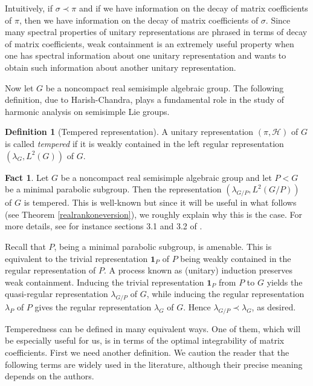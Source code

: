 \documentclass[psamsfonts]{amsart}
\theoremstyle{definition}
\newtheorem{defn}[thm]{Definition}
\newtheorem{fact}[thm]{Fact}
\theoremstyle{remark}
\numberwithin{equation}{section}
\begin{document}
Intuitively, if $\sigma \prec \pi$ and if we have information on the decay of matrix coefficients of $\pi$, then we have information on the decay of matrix coefficients of $\sigma$. Since many spectral properties of unitary representations are phrased in terms of decay of matrix coefficients, weak containment is an extremely useful property when one has spectral information about one unitary representation and wants to obtain such information about another unitary representation.
\par 
Now let $G$ be a noncompact real semisimple algebraic group. The following definition, due to Harish-Chandra, plays a fundamental role in the study of harmonic analysis on semisimple Lie groups.
\begin{defn} [Tempered representation]
A unitary representation $(\pi, \mathcal{H})$ of $G$ is called \emph{tempered} if it is weakly contained in the left regular representation $(\lambda_{G}, L^2(G))$ of $G$.
\end{defn}
\begin{fact}
\label{tempforminparabolic}
Let $G$ be a noncompact real semisimple algebraic group and let $P < G$ be a minimal parabolic subgroup. Then the representation $(\lambda_{G/P}, L^2(G/P))$ of $G$ is tempered. This is well-known but since it will be useful in what follows (see Theorem \ref{realrankoneversion}), we roughly explain why this is the case. For more details, see for instance sections 3.1 and 3.2 of \cite{BL}.
\par 
Recall that $P$, being a minimal parabolic subgroup, is amenable. This is equivalent to the trivial representation $\mathbf{1}_{P}$ of $P$ being weakly contained in the regular representation of $P$. A process known as (unitary) induction preserves weak containment. Inducing the trivial representation $\mathbf{1}_{P}$ from $P$ to $G$ yields the quasi-regular representation $\lambda_{G/P}$ of $G$, while inducing the regular representation $\lambda_{P}$ of $P$ gives the regular representation $\lambda_{G}$ of $G$. Hence $\lambda_{G/P} \prec \lambda_{G}$, as desired.
\end{fact} Temperedness can be defined in many equivalent ways. One of them, which will be especially useful for us, is in terms of the optimal integrability of matrix coefficients. First we need another definition. We caution the reader that the following terms are widely used in the literature, although their precise meaning depends on the authors.
\end{document}

